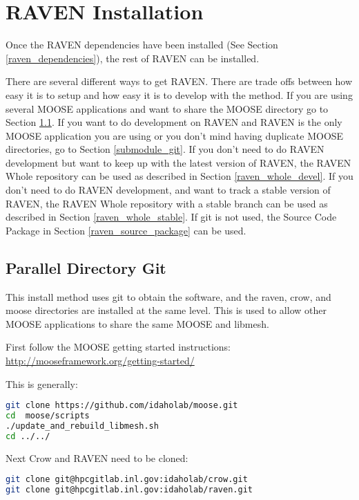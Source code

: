 \goToRavenInstallation

\section{RAVEN Installation}
\label{raven_installation}

Once the RAVEN dependencies have been installed (See Section
\ref{raven_dependencies}), the rest of RAVEN can be installed.

There are several different ways to get RAVEN.  There are trade offs
between how easy it is to setup and how easy it is to develop with the
method.  If you are using several MOOSE applications and want to share
the MOOSE directory go to Section \ref{parallel_directory_git}.  If
you want to do development on RAVEN and RAVEN is the only MOOSE
application you are using or you don't mind having duplicate MOOSE
directories, go to Section \ref{submodule_git}.  If you don't need to
do RAVEN development but want to keep up with the latest version of
RAVEN, the RAVEN Whole repository can be used as described in Section
\ref{raven_whole_devel}.  If you don't need to do RAVEN development,
and want to track a stable version of RAVEN, the RAVEN Whole
repository with a stable branch can be used as described in Section
\ref{raven_whole_stable}.  If git is not used, the Source Code
Package in Section \ref{raven_source_package} can be used.

\subsection{Parallel Directory Git}
\label{parallel_directory_git}

This install method uses git to obtain the software, and the raven,
crow, and moose directories are installed at the same level.  This is
used to allow other MOOSE applications to share the same MOOSE and
libmesh.

First follow the MOOSE getting started instructions:  \url{http://mooseframework.org/getting-started/}

This is generally:

\begin{lstlisting}[language=bash]
git clone https://github.com/idaholab/moose.git
cd  moose/scripts
./update_and_rebuild_libmesh.sh
cd ../../
\end{lstlisting}

Next Crow and RAVEN need to be cloned:

\begin{lstlisting}[language=bash]
git clone git@hpcgitlab.inl.gov:idaholab/crow.git
git clone git@hpcgitlab.inl.gov:idaholab/raven.git
\end{lstlisting}

